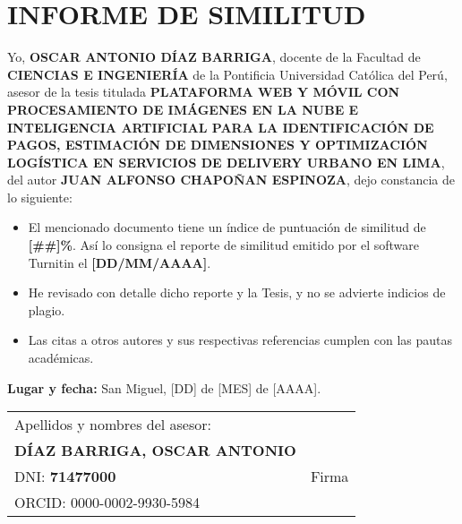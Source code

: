 \chapter*{INFORME DE SIMILITUD}

\vspace{1cm}

Yo, \textbf{OSCAR ANTONIO DÍAZ BARRIGA}, docente de la Facultad de \textbf{CIENCIAS E INGENIERÍA} de la Pontificia Universidad Católica del Perú, asesor de la tesis titulada \textbf{PLATAFORMA WEB Y MÓVIL CON PROCESAMIENTO DE IMÁGENES EN LA NUBE E INTELIGENCIA ARTIFICIAL PARA LA IDENTIFICACIÓN DE PAGOS, ESTIMACIÓN DE DIMENSIONES Y OPTIMIZACIÓN LOGÍSTICA EN SERVICIOS DE DELIVERY URBANO EN LIMA}, del autor \textbf{JUAN ALFONSO CHAPOÑAN ESPINOZA}, dejo constancia de lo siguiente:

\begin{itemize}
    \item El mencionado documento tiene un índice de puntuación de similitud de \textbf{[\#\#]\%}. Así lo consigna el reporte de similitud emitido por el software Turnitin el \textbf{[DD/MM/AAAA]}.
    
    \item He revisado con detalle dicho reporte y la Tesis, y no se advierte indicios de plagio.
    
    \item Las citas a otros autores y sus respectivas referencias cumplen con las pautas académicas.
\end{itemize}

\vspace{1.5cm}

\textbf{Lugar y fecha:} San Miguel, [DD] de [MES] de [AAAA].

\vspace{2cm}

\begin{table}[H]
\centering
\begin{tabular}{|p{7cm}|p{7cm}|}
\hline
Apellidos y nombres del asesor: & \\
\textbf{DÍAZ BARRIGA, OSCAR ANTONIO} & \\
\hline
DNI: \textbf{71477000} & Firma \\
\hline
ORCID: 0000-0002-9930-5984 & \\
\hline
\end{tabular}
\end{table}
